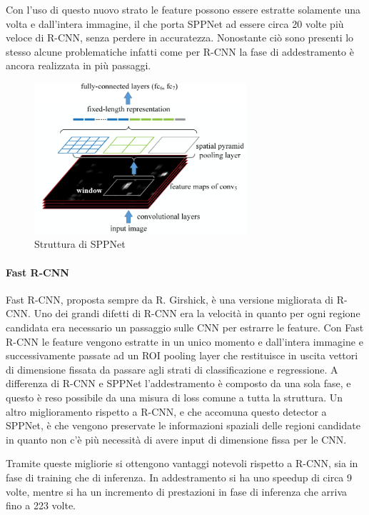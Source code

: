 Con l'uso di questo nuovo strato le feature possono essere estratte solamente una volta e dall'intera immagine, il che porta \ac{SPPNet} ad essere circa 20 volte più veloce di R-CNN, senza perdere in accuratezza. 
Nonostante ciò sono presenti lo stesso alcune problematiche infatti come per R-CNN la fase di addestramento è ancora realizzata in più passaggi.
\begin{figure}[]
    \centering
    \includegraphics[width=0.7\textwidth]{images/spm_det.pdf}
    \caption{Struttura di \ac{SPPNet} \cite{he2015spatial}}
    \label{fig:spnnet_structure}
\end{figure}
\paragraph{Fast R-CNN}
Fast R-CNN, proposta sempre da R. Girshick, \cite{girshick2015fast} è una versione migliorata di R-CNN. Uno dei grandi difetti di R-CNN era la velocità in quanto per ogni regione candidata era necessario un passaggio sulle \ac{CNN} per estrarre le feature. 
Con Fast R-CNN le feature vengono estratte in un unico momento e dall'intera immagine e successivamente passate ad  un \ac{ROI} pooling layer che restituisce in uscita vettori di dimensione fissata da passare agli strati di classificazione e regressione. 
A differenza di R-CNN e \ac{SPPNet} l'addestramento è composto da una sola fase, e questo è reso possibile da una misura di loss comune a tutta la struttura. 
Un altro miglioramento rispetto a R-CNN, e che accomuna questo detector a \ac{SPPNet}, è che vengono preservate le informazioni spaziali delle regioni candidate in quanto non c'è più necessità di avere input di dimensione fissa per le \ac{CNN}. 

Tramite queste migliorie si ottengono vantaggi notevoli rispetto a R-CNN, sia in fase di training che di inferenza. In addestramento si ha uno speedup di circa 9 volte, mentre si ha un incremento di prestazioni in fase di inferenza che arriva fino a 223 volte. 
